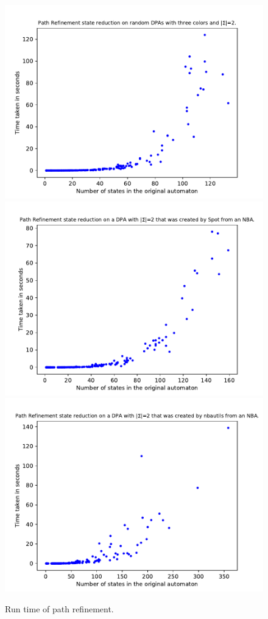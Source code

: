 \begin{figure}
	\centering
	\includegraphics[page=1,height=.3\textheight]{../data/analysis/path_refinement/gendet_ap1.pdf} 
	\includegraphics[page=1,height=.3\textheight]{../data/analysis/path_refinement/detspot_ap1.pdf} 
	\includegraphics[page=1,height=.3\textheight]{../data/analysis/path_refinement/detnbaut_ap1.pdf} 
	\caption{Run time of path refinement.}
	\label{exp:fig:path_refinement_time}
\end{figure}